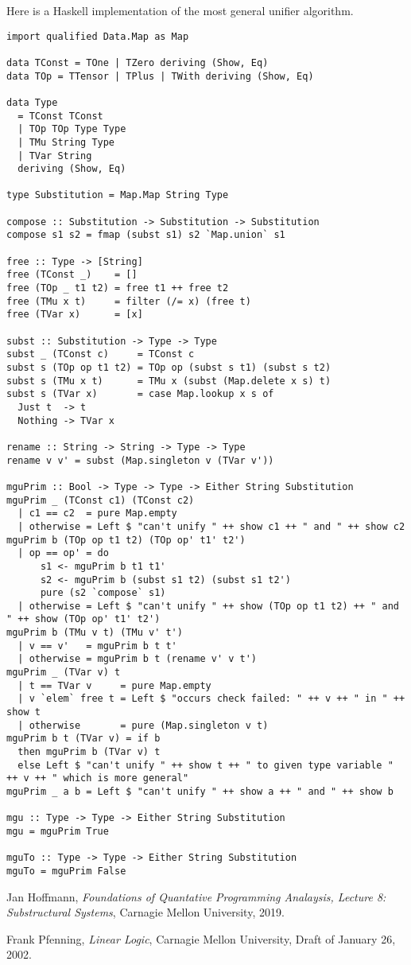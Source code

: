 \documentclass{article}
\begin{document}
Here is a Haskell implementation of the most general unifier algorithm.

\begin{lstlisting}
import qualified Data.Map as Map

data TConst = TOne | TZero deriving (Show, Eq)
data TOp = TTensor | TPlus | TWith deriving (Show, Eq)

data Type 
  = TConst TConst
  | TOp TOp Type Type
  | TMu String Type
  | TVar String
  deriving (Show, Eq)

type Substitution = Map.Map String Type

compose :: Substitution -> Substitution -> Substitution
compose s1 s2 = fmap (subst s1) s2 `Map.union` s1

free :: Type -> [String]
free (TConst _)    = []
free (TOp _ t1 t2) = free t1 ++ free t2
free (TMu x t)     = filter (/= x) (free t)
free (TVar x)      = [x]

subst :: Substitution -> Type -> Type
subst _ (TConst c)     = TConst c
subst s (TOp op t1 t2) = TOp op (subst s t1) (subst s t2)
subst s (TMu x t)      = TMu x (subst (Map.delete x s) t)
subst s (TVar x)       = case Map.lookup x s of
  Just t  -> t
  Nothing -> TVar x

rename :: String -> String -> Type -> Type
rename v v' = subst (Map.singleton v (TVar v'))

mguPrim :: Bool -> Type -> Type -> Either String Substitution
mguPrim _ (TConst c1) (TConst c2)
  | c1 == c2  = pure Map.empty
  | otherwise = Left $ "can't unify " ++ show c1 ++ " and " ++ show c2
mguPrim b (TOp op t1 t2) (TOp op' t1' t2')
  | op == op' = do
      s1 <- mguPrim b t1 t1'
      s2 <- mguPrim b (subst s1 t2) (subst s1 t2')
      pure (s2 `compose` s1)
  | otherwise = Left $ "can't unify " ++ show (TOp op t1 t2) ++ " and " ++ show (TOp op' t1' t2')
mguPrim b (TMu v t) (TMu v' t')
  | v == v'   = mguPrim b t t'
  | otherwise = mguPrim b t (rename v' v t')
mguPrim _ (TVar v) t
  | t == TVar v     = pure Map.empty
  | v `elem` free t = Left $ "occurs check failed: " ++ v ++ " in " ++ show t
  | otherwise       = pure (Map.singleton v t)
mguPrim b t (TVar v) = if b
  then mguPrim b (TVar v) t
  else Left $ "can't unify " ++ show t ++ " to given type variable " ++ v ++ " which is more general"
mguPrim _ a b = Left $ "can't unify " ++ show a ++ " and " ++ show b

mgu :: Type -> Type -> Either String Substitution
mgu = mguPrim True

mguTo :: Type -> Type -> Either String Substitution
mguTo = mguPrim False
\end{lstlisting}

\begin{thebibliography}{9}

  Jan Hoffmann,
  \textit{Foundations of Quantative Programming Analaysis, Lecture 8: Substructural Systems},
  Carnagie Mellon University,
  2019.

  Frank Pfenning,
  \textit{Linear Logic},
  Carnagie Mellon University,
  Draft of January 26, 2002.
  
\end{thebibliography}
\end{document}
